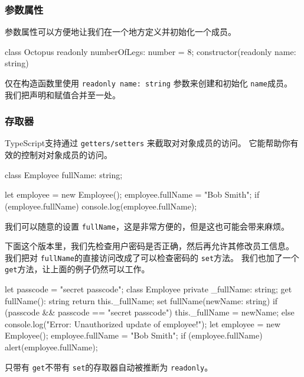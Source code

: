\subsubsection*{参数属性}

参数属性可以方便地让我们在一个地方定义并初始化一个成员。 

\begin{TypeScript}
class Octopus {
    readonly numberOfLegs: number = 8;
    constructor(readonly name: string) {
    }
}
\end{TypeScript}

仅在构造函数里使用 \texttt{readonly name: string} 参数来创建和初始化 \texttt{name}成员。 我们把声明和赋值合并至一处。

\subsubsection*{存取器}

TypeScript支持通过 \texttt{getters/setters} 来截取对对象成员的访问。 它能帮助你有效的控制对对象成员的访问。

\begin{TypeScript}
class Employee {
    fullName: string;
}

let employee = new Employee();
employee.fullName = "Bob Smith";
if (employee.fullName) {
    console.log(employee.fullName);
}
\end{TypeScript}

我们可以随意的设置 \texttt{fullName}，这是非常方便的，但是这也可能会带来麻烦。

下面这个版本里，我们先检查用户密码是否正确，然后再允许其修改员工信息。 我们把对 \texttt{fullName}的直接访问改成了可以检查密码的 \texttt{set}方法。 我们也加了一个 \texttt{get}方法，让上面的例子仍然可以工作。

\begin{TypeScript}
let passcode = "secret passcode";
class Employee {
    private _fullName: string;
    get fullName(): string {
        return this._fullName;
    }
    set fullName(newName: string) {
        if (passcode && passcode == "secret passcode") {
            this._fullName = newName;
        }
        else {
            console.log("Error: Unauthorized update of employee!");
        }
    }
}
let employee = new Employee();
employee.fullName = "Bob Smith";
if (employee.fullName) {
    alert(employee.fullName);
}
\end{TypeScript}

只带有 \texttt{get}不带有 \texttt{set}的存取器自动被推断为 \texttt{readonly}。

